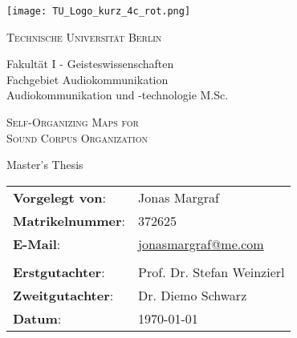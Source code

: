 
\pagestyle{empty}
\begin{otherlanguage}{ngerman}
\begin{titlepage}
  \centering
  \texttt{[image: TU\_Logo\_kurz\_4c\_rot.png]}\par
  \vspace{5mm}
  {\Large\textsc{Technische Universität Berlin}\par\vspace{5mm}}
  Fakultät I - Geisteswissenschaften\\
  Fachgebiet Audiokommunikation\\
  Audiokommunikation und -technologie M.Sc.\\
  \vspace{2cm}
  {\huge\textsc{Self-Organizing Maps for \\Sound Corpus Organization}\par}
  \vspace{2cm}
  {\Large Master's Thesis\par}
  \vspace{2cm}
  \begin{table}[!htb]
    \begin{tabular}{l l}
    \textbf{Vorgelegt von}: & Jonas Margraf \\
    \textbf{Matrikelnummer}: & 372625 \\
    \textbf{E-Mail}: & \href{jonasmargraf@me.com}{jonasmargraf@me.com} \\
    & \\
    \textbf{Erstgutachter}: & Prof. Dr. Stefan Weinzierl \\
    \textbf{Zweitgutachter}: & Dr. Diemo Schwarz \\
    \textbf{Datum}: &\today\\
    \end{tabular}
  \end{table}
\end{titlepage}
\end{otherlanguage}
